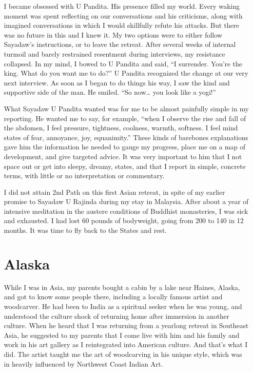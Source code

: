 \documentclass[a5paper,10pt,english]{book}
\begin{document}
\sphinxAtStartPar
I became obsessed with U Pandita. His presence filled my world. Every
waking moment was spent reflecting on our conversations and his
criticisms, along with imagined conversations in which I would
skillfully refute his attacks. But there was no future in this and I
knew it. My two options were to either follow Sayadaw’s instructions, or
to leave the retreat. After several weeks of internal turmoil and barely
restrained resentment during interviews, my resistance collapsed. In my
mind, I bowed to U Pandita and said, “I surrender. You’re the king. What
do you want me to do?” U Pandita recognized the change at our very next
interview. As soon as I began to do things his way, I saw the kind and
supportive side of the man. He smiled. “So now… you look like a yogi!”

\sphinxAtStartPar
What Sayadaw U Pandita wanted was for me to be almost painfully simple
in my reporting. He wanted me to say, for example, “when I observe the
rise and fall of the abdomen, I feel pressure, tightness, coolness,
warmth, softness. I feel mind states of fear, annoyance, joy,
equanimity.” These kinds of bare\sphinxhyphen{}bones explanations gave him the
information he needed to gauge my progress, place me on a map of
development, and give targeted advice. It was very important to him that
I not space out or get into sleepy, dreamy, states, and that I report in
simple, concrete terms, with little or no interpretation or commentary.

\sphinxAtStartPar
I did not attain 2nd Path on this first Asian retreat, in spite of my
earlier promise to Sayadaw U Rajinda during my stay in Malaysia. After
about a year of intensive meditation in the austere conditions of
Buddhist monasteries, I was sick and exhausted. I had lost 60 pounds of
bodyweight, going from 200 to 140 in 12 months. It was time to fly back
to the States and rest.


\section{Alaska}
\label{\detokenize{main-1:alaska}}
\sphinxAtStartPar
While I was in Asia, my parents bought a cabin by a lake near Haines,
Alaska, and got to know some people there, including a locally famous
artist and woodcarver. He had been to India as a spiritual seeker when
he was young, and understood the culture shock of returning home after
immersion in another culture. When he heard that I was returning from a
year\sphinxhyphen{}long retreat in Southeast Asia, he suggested to my parents that I
come live with him and his family and work in his art gallery as I
reintegrated into American culture. And that’s what I did. The artist
taught me the art of woodcarving in his unique style, which was in
heavily influenced by Northwest Coast Indian Art.
\end{document}
